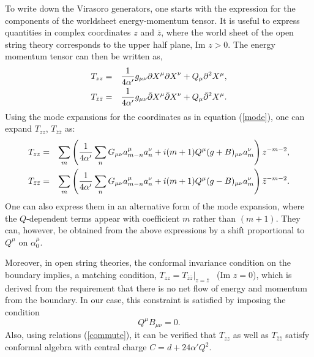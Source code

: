 \documentclass[a4paper,12pt]{article}
\begin{document}
To write down the Virasoro generators, one starts with the expression 
for the components of the worldsheet energy-momentum tensor. 
It is useful to express quantities in complex coordinates $z$ and 
$\bar z$, where the world sheet of the open string theory corresponds 
to the upper half plane, Im $z > 0$. The energy momentum tensor
can then be written as, 
\begin{eqnarray}
T_{zz} & = & {1\over 4 \alpha'} g_{\mu\nu} {\partial X}^{\mu}
{\partial X}^{\nu} + Q_{\mu}{\partial}^2 X^{\mu}, \nonumber \\
T_{\bar z \bar z} & = & {1\over 4\alpha'} g_{\mu\nu} \bar\partial
X^{\mu} \bar\partial X^{\nu} + Q_{\mu}{\bar\partial}^2 X^{\mu}.
\label{t++--}
\end{eqnarray}
Using the mode expansions for the coordinates as in equation 
(\ref{mode}), one can expand $T_{z z}$, $T_{\bar{z} \bar{z}}$ as:
\begin{eqnarray}
 T_{z z} & = & \sum_m 
\left({1\over 4\alpha'} 
        \sum_n G_{\mu \nu} a^{\mu}_{m-n} a^{\nu}_n + 
        i (m +1) Q^{\mu} (g + B )_{\mu \nu} a^{\nu}_{m} \right)
         {z}^{-m - 2}, \nonumber \\
T_{\bar{z} \bar{z}} & = & \sum_m \left( {1\over 4\alpha'} 
         \sum_n G_{\mu \nu} a^{\mu}_{m-n} a^{\nu}_n + 
        i (m + 1) Q^{\mu} (g - B )_{\mu \nu} a^{\nu}_{m}
         \right) {\bar{z}}^{-m - 2}.
\label{t-mode}
\end{eqnarray}
One can also express them in an alternative form of the mode 
expansion, where the $Q$-dependent terms appear with coefficient 
$m$ rather than $(m+1)$. They can, however, be obtained from 
the above expressions by a shift proportional to $Q^{\mu}$ 
on $\alpha_0^{\mu}$.
 
Moreover, in open string theories, the conformal invariance condition 
on the boundary implies, a matching 
condition, $T_{z z} = T_{\bar{z} \bar{z}} |_{z = \bar{z}}$ ~(Im $z = 0$), 
which is
derived from the requirement that there is no net flow of 
energy and momentum from the boundary.
In our case, this constraint 
is satisfied by imposing the condition 
\begin{equation}
Q^{\mu} B_{\mu \nu} = 0.
\label{condition}
\end{equation} 
Also, using relations (\ref{commute}), 
it can be verified that $T_{z z}$ as well as $T_{\bar{z} \bar{z}}$ 
satisfy conformal algebra with central charge 
$C= d + 24 \alpha' Q^2$. 
\end{document}
